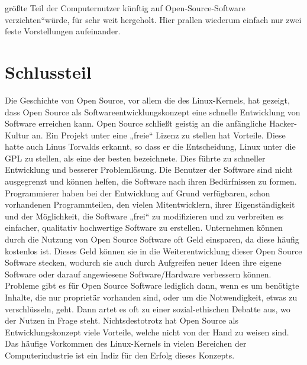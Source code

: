 \documentclass[a4paper,12pt]{article}
\begin{document}
größte Teil der Computernutzer künftig auf Open-Source-Software verzichten“\footnotemark[33] würde, für sehr weit hergeholt. Hier prallen wiederum einfach nur zwei feste Vorstellungen aufeinander.
\newpage
\section{Schlussteil}
Die Geschichte von Open Source, vor allem die des Linux-Kernels, hat gezeigt, dass Open Source als Softwareentwicklungskonzept eine schnelle Entwicklung von Software erreichen kann. Open Source schließt geistig an die anfängliche Hacker-Kultur an. Ein Projekt unter eine „freie“ Lizenz zu stellen hat Vorteile. Diese hatte auch Linus Torvalds erkannt, so dass er die Entscheidung, Linux unter die GPL zu stellen, als eine der besten bezeichnete. Dies führte zu schneller Entwicklung und besserer Problemlösung. Die Benutzer der Software sind nicht ausgegrenzt und können helfen, die Software nach ihren Bedürfnissen zu formen. Programmierer haben bei der Entwicklung auf Grund verfügbaren, schon vorhandenen Programmteilen, den vielen Mitentwicklern, ihrer Eigenständigkeit und der Möglichkeit, die Software „frei“ zu modifizieren und zu verbreiten es einfacher, qualitativ hochwertige Software zu erstellen. Unternehmen können durch die Nutzung von Open Source Software oft Geld einsparen, da diese häufig kostenlos ist. Dieses Geld können sie in die Weiterentwicklung dieser Open Source Software stecken, wodurch sie auch durch Aufgreifen neuer Ideen ihre eigene Software oder darauf angewiesene Software/Hardware verbessern können. Probleme gibt es für Open Source Software lediglich dann, wenn es um benötigte Inhalte, die nur proprietär vorhanden sind, oder um die Notwendigkeit, etwas zu verschlüsseln, geht. Dann artet es oft zu einer sozial-ethischen Debatte aus, wo der Nutzen in Frage steht. Nichtsdestotrotz hat Open Source als Entwicklungskonzept viele Vorteile, welche nicht von der Hand zu weisen sind. Das häufige Vorkommen des Linux-Kernels in vielen Bereichen der Computerindustrie ist ein Indiz für den Erfolg dieses Konzepts.
\newpage
{}
\end{document}
